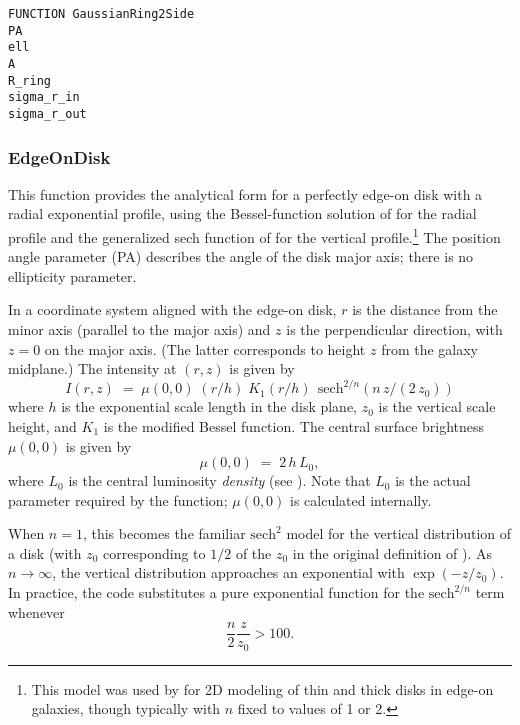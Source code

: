 \documentclass[10pt,a4paper,article]{memoir}
\begin{document}
\begin{verbatim}
FUNCTION GaussianRing2Side
PA
ell
A
R_ring
sigma_r_in
sigma_r_out
\end{verbatim}


\subsubsection{EdgeOnDisk}

This function provides the analytical form for a perfectly edge-on disk with a
radial exponential profile, using the Bessel-function solution of \citet{vdk81}
for the radial profile and the generalized sech function of \citet{vdk88} for
the vertical profile.\footnote{This model was used by \citet{yoachim06} for 2D
modeling of thin and thick disks in edge-on galaxies, though typically with $n$
fixed to values of 1 or 2.} The position angle parameter (PA) describes the
angle of the disk major axis; there is no ellipticity parameter.

In a coordinate system aligned with the edge-on disk, $r$ is the distance from the minor
axis (parallel to the major axis) and $z$ is the perpendicular direction, with $z = 0$
on the major axis. (The latter corresponds to height $z$ from the galaxy midplane.) The 
intensity at $(r,z)$ is given by
\begin{equation}
I(r,z) \; = \; \mu(0,0) \; (r/h) \; K_{1}(r/h) \;\, {\mathrm{sech}}^{2/n} (n \, z/(2 \, z_{0}))
\end{equation}
where $h$ is the exponential scale length in the disk plane, $z_{0}$ is the vertical
scale height, and $K_{1}$ is the modified Bessel function. The central surface brightness 
$\mu(0,0)$ is given by
\begin{equation}
\mu(0,0) \; = \;  2 \, h \, L_{0},
\end{equation}
where $L_{0}$ is the central luminosity \textit{density} (see \citealt{vdk81}). Note that 
$L_{0}$ is the actual parameter required by the function; $\mu(0,0)$ is calculated 
internally.

When $n = 1$, this becomes the familiar $\mathrm{sech}^2$ model for the
vertical distribution of a disk (with $z_{0}$ corresponding to $1/2$ of the
$z_0$ in the original definition of \citet{vdk81}). As $n \rightarrow \infty$,
the vertical distribution approaches an exponential with $\exp(-z/z_{0})$. In practice,
the code substitutes a pure exponential function for the $\mathrm{sech}^{2/n}$ term whenever 
\begin{equation}
\frac{n}{2} \frac{z}{z_{0}} > 100.
\end{equation}
\end{document}

